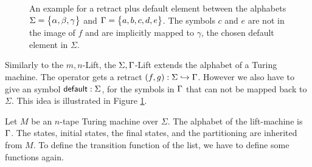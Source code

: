 \documentclass{psartcl}
\begin{document}
\begin{figure}
  \center
  \caption{An example for a retract plus default element between the alphabets $\Sigma = \bigl\{ \alpha, \beta, \gamma \bigr \}$ and $\Gamma =
    \bigl\{ a,b,c,d,e \bigr \}$.  The symbols $c$ and $e$ are not in the image of $f$ and are implicitly mapped to $\gamma$, the chosen default element in
  $\Sigma$.}
\label{fig:sigma-tau-lift-example-mapping}
\end{figure}

Similarly to the $m,n$-Lift, the $\Sigma,\Gamma$-Lift extends the alphabet of a Turing machine.  The operator gets a retract $(f,g) : \Sigma
\hookrightarrow \Gamma$.  However we also have to give an symbol $\textsf{default}:\Sigma$, for the symbols in $\Gamma$ that can not be mapped back to
$\Sigma$.  This idea is illustrated in Figure \ref{fig:sigma-tau-lift-example-mapping}.

Let $M$ be an $n$-tape Turing machine over $\Sigma$.  The alphabet of the lift-machine is $\Gamma$.  The states, initial states, the final states, and
the partitioning are inherited from $M$.  To define the transition function of the list, we have to define some functions again.
\end{document}
